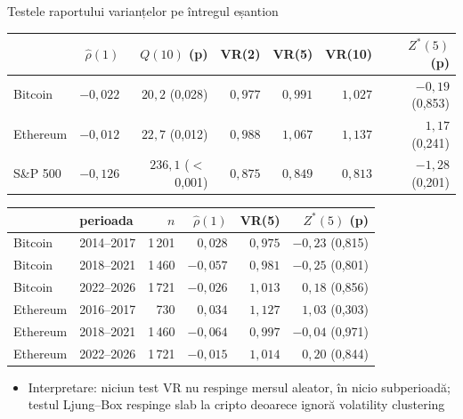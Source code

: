 \begin{frame}{Testele raportului varianțelor pe întregul eșantion}
\itemsize{\footnotesize}
\begin{center}
\scriptsize
\begin{tabular}{lrrrrrr}
\toprule
& $\hat\rho(1)$ & $Q(10)$ (p) & VR(2) & VR(5) & VR(10) & $Z^*(5)$ (p) \\
\midrule
Bitcoin & $-0{,}022$ & $20{,}2$ (0{,}028) & $0{,}977$ & $0{,}991$ & $1{,}027$ & $-0{,}19$ (0{,}853) \\
Ethereum & $-0{,}012$ & $22{,}7$ (0{,}012) & $0{,}988$ & $1{,}067$ & $1{,}137$ & $1{,}17$ (0{,}241) \\
S\&P 500 & $-0{,}126$ & $236{,}1$ ($<$\,0{,}001) & $0{,}875$ & $0{,}849$ & $0{,}813$ & $-1{,}28$ (0{,}201) \\
\bottomrule
\end{tabular}
\end{center}
\begin{center}
\scriptsize
\begin{tabular}{llrrrr}
\toprule
& perioada & $n$ & $\hat\rho(1)$ & VR(5) & $Z^*(5)$ (p) \\
\midrule
Bitcoin & 2014--2017 & 1\,201 & $0{,}028$ & $0{,}975$ & $-0{,}23$ (0{,}815) \\
Bitcoin & 2018--2021 & 1\,460 & $-0{,}057$ & $0{,}981$ & $-0{,}25$ (0{,}801) \\
Bitcoin & 2022--2026 & 1\,721 & $-0{,}026$ & $1{,}013$ & $0{,}18$ (0{,}856) \\
Ethereum & 2016--2017 & 730 & $0{,}034$ & $1{,}127$ & $1{,}03$ (0{,}303) \\
Ethereum & 2018--2021 & 1\,460 & $-0{,}064$ & $0{,}997$ & $-0{,}04$ (0{,}971) \\
Ethereum & 2022--2026 & 1\,721 & $-0{,}015$ & $1{,}014$ & $0{,}20$ (0{,}844) \\
\bottomrule
\end{tabular}
\end{center}
\begin{itemize}
    \item Interpretare: niciun test VR nu respinge mersul aleator, în nicio subperioadă; testul Ljung--Box respinge slab la cripto deoarece ignoră volatility clustering
\end{itemize}
\end{frame}

